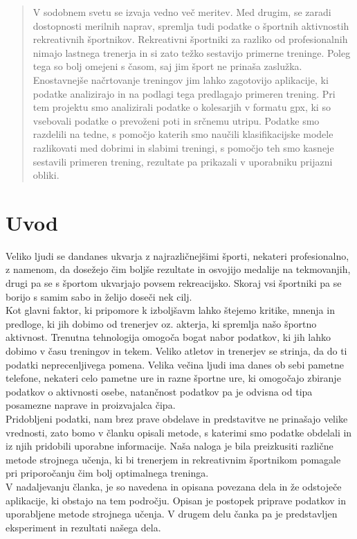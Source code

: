 \documentclass{acm_proc_article-sp}
\begin{document}
\maketitle
\begin{abstract}
V sodobnem svetu se izvaja vedno več meritev. Med drugim, se zaradi dostopnosti merilnih naprav, spremlja tudi podatke o športnih aktivnostih rekreativnih športnikov. Rekreativni športniki za razliko od profesionalnih nimajo lastnega trenerja in si zato težko sestavijo primerne treninge. Poleg tega so bolj omejeni s časom, saj jim šport ne prinaša zaslužka. Enostavnejše načrtovanje treningov jim lahko zagotovijo aplikacije, ki podatke analizirajo in na podlagi tega predlagajo primeren trening. Pri tem projektu smo analizirali podatke o kolesarjih v formatu gpx, ki so vsebovali podatke o prevoženi poti in srčnemu utripu. Podatke smo razdelili na tedne, s pomočjo katerih smo naučili klasifikacijske modele razlikovati med dobrimi in slabimi treningi, s pomočjo teh smo kasneje sestavili primeren trening, rezultate pa prikazali v uporabniku prijazni obliki.
\end{abstract}




\section{Uvod}
Veliko ljudi se dandanes ukvarja z najrazličnejšimi športi, nekateri profesionalno, z namenom, da dosežejo čim boljše rezultate in osvojijo medalije na tekmovanjih, drugi pa se s športom ukvarjajo povsem rekreacijsko. Skoraj vsi športniki pa se borijo s samim sabo in želijo doseči nek cilj.\\
Kot glavni faktor, ki pripomore k izboljšavm lahko štejemo kritike, mnenja in predloge, ki jih dobimo od trenerjev oz. akterja, ki spremlja našo športno aktivnost. Trenutna tehnologija omogoča bogat nabor podatkov, ki jih lahko dobimo v času treningov in tekem. Veliko atletov in trenerjev se strinja, da do ti podatki neprecenljivega pomena\cite{Liebermann}. Velika večina ljudi ima danes ob sebi pametne telefone, nekateri celo pametne ure in razne športne ure, ki omogočajo zbiranje podatkov o aktivnosti osebe, natančnost podatkov pa je odvisna od tipa posamezne naprave in proizvajalca čipa\cite{Case}.\\
Pridobljeni podatki, nam brez prave obdelave in predstavitve ne prinašajo velike vrednosti, zato bomo v  članku opisali metode, s katerimi smo podatke obdelali in iz njih pridobili uporabne informacije. Naša naloga je bila preizkusiti različne metode strojnega učenja, ki bi trenerjem in rekreativnim športnikom pomagale pri priporočanju čim bolj optimalnega treninga.\\
V nadaljevanju članka, je so navedena in opisana povezana dela in že odstoječe aplikacije, ki obstajo na tem področju. Opisan je postopek priprave podatkov in uporabljene metode strojnega učenja. V drugem delu čanka pa je predstavljen eksperiment in rezultati našega dela.
\end{document}
